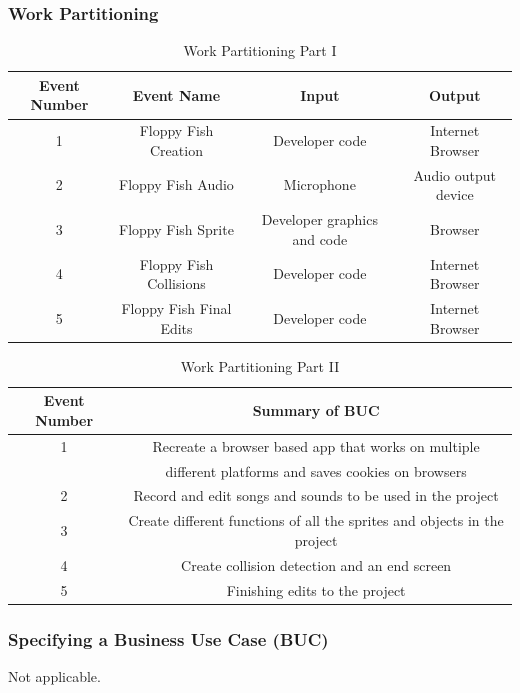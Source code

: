 \documentclass[11pt, oneside]{article}   	%
\begin{document}
\subsubsection*{Work Partitioning}
\begin{table}[H]
\caption{Work Partitioning Part I}
\begin{center}
\begin{tabular}{|c|c|c|c|}
\hline
Event Number & Event Name & Input & Output\\
\hline
1 & Floppy Fish Creation & Developer code & Internet Browser\\
\hline
2 & Floppy Fish Audio & Microphone & Audio output device\\
\hline
3 & Floppy Fish Sprite & Developer graphics and code & Browser\\
\hline
4 & Floppy Fish Collisions & Developer code & Internet Browser\\
\hline
5 & Floppy Fish Final Edits & Developer code & Internet Browser\\
\hline
\end{tabular}
\end{center}
\label{default}
\end{table}%

\begin{table}[H]
\caption{Work Partitioning Part II}
\begin{center}
\begin{tabular}{|c|c|}

\hline
Event Number & Summary of BUC\\
\hline
1 & Recreate a browser based app that works on multiple\\ &different platforms and saves cookies on browsers\\
\hline
2 & Record and edit songs and sounds to be used in the project\\
\hline
3 & Create different functions of all the sprites and objects in the project\\
\hline
4 & Create collision detection and an end screen\\
\hline
5 & Finishing edits to the project\\
\hline

\end{tabular}
\end{center}
\label{default}
\end{table}%



\subsubsection*{Specifying a Business Use Case (BUC)}
Not applicable.
\end{document}
